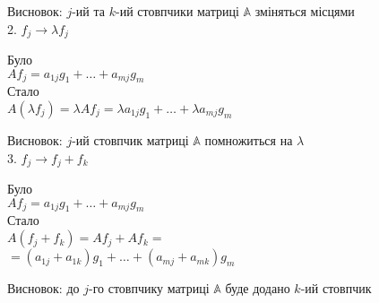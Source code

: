 \documentclass[a4paper, 14pt]{extarticle}
\def\bigline{\vspace{5mm}\\}
\begin{document}
	Висновок: $j$-ий та $k$-ий стовпчики матриці $\mathbb{A}$ зміняться місцями
	\bigline
	2. $f_j \rightarrow \lambda f_j$
\multicolsep=0pt
	\begin{multicols}{2}
	Було \\
$Af_j = a_{1j}g_1 + \dots + a_{mj}g_m$
	\columnbreak
	\\
	Стало \\
$A(\lambda f_j) = \lambda Af_j = \lambda a_{1j}g_1 + \dots + \lambda a_{mj}g_m$
	\end{multicols}
	Висновок: $j$-ий стовпчик матриці $\mathbb{A}$ помножиться на $\lambda$
	\bigline
	3. $f_j \rightarrow f_j+f_k$
\multicolsep=0pt
	\begin{multicols}{2}
	Було \\
$Af_j = a_{1j}g_1 + \dots + a_{mj}g_m$
	\columnbreak
	\\
	Стало \\
$A(f_j+f_k) = Af_j + Af_k =$\\
$= (a_{1j}+a_{1k})g_1 + \dots + (a_{mj}+a_{mk})g_m$
	\end{multicols}
	Висновок: до $j$-го стовпчику матриці $\mathbb{A}$ буде додано $k$-ий стовпчик
	\bigline
	
\end{document}
